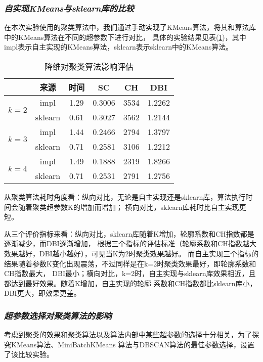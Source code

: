 \documentclass{acm_proc_article-sp}
\begin{document}
\subsubsection{\textit{自实现KMeans与sklearn库的比较}}
在本次实验使用的聚类算法中，我们通过手动实现了KMeans算法，将其和算法库中的KMeans算法在不同的超参数下进行对比，
具体的实验结果见表(\ref{IMPL})，其中impl表示自主实现的KMeans算法，sklearn表示sklearn中的KMeans算法。
\begin{table}[]
\centering
\caption{降维对聚类算法影响评估}
\begin{tabular}{@{}c|c|cccc@{}}
\toprule
                            & 来源        & 时间 & SC & CH & DBI \\ \midrule
\multirow{2}{*}{$k=2$}      & impl        &1.29&0.3006&3534&1.2262\\
                            & sklearn     &0.61&0.3027&3562&1.2144\\ \midrule
\multirow{2}{*}{$k=3$}      & impl        &1.44&0.2466&2794&1.3797\\
                            & sklearn     &0.71&0.2581&3106&1.2212\\ \midrule
\multirow{2}{*}{$k=4$}      & impl        &1.49&0.1888&2319&1.8266\\
                            & sklearn     &0.71&0.2531&2791&1.2756\\ \bottomrule
\end{tabular}
\label{IMPL}
\end{table}
       
从聚类算法耗时角度看：纵向对比，无论是自主实现还是sklearn库，算法执行时间会随着聚类超参数K的增加而增加；
横向对比，sklearn库耗时比自主实现更短。

从三个评价指标来看：纵向对比，sklearn库随着K增加，轮廓系数和CH指数都是逐渐减少，而DBI逐渐增加，
根据三个指标的评估标准（轮廓系数和CH指数越大效果越好，DBI越小越好），可见当K为2时聚类效果越好。
而自主实现三个指标的结果随着参数K变化出现震荡，不过同样是在k=2时聚类效果最好，即轮廓系数和CH指数最大，
DBI最小；横向对比，k=2时，自主实现与sklearn库效果相近，且都达到最好效果。随着K增加，自主实现的轮廓
系数和CH指数都比sklearn库小，DBI更大，即效果更差。

\subsubsection{\textit{超参数选择对聚类算法的影响}}

考虑到聚类的效果和聚类算法以及算法内部中某些超参数的选择十分相关，为了探究KMeans算法、MiniBatchKMeans
算法与DBSCAN算法的最佳参数选择，设置了该比较实验。
\end{document}
